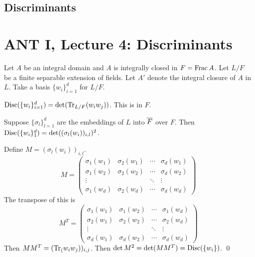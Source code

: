 \newpage
\subsection{Discriminants\label{sec:620_4}}

\newpage
\section{ANT I, Lecture 4: Discriminants}

Let $A$ be an integral domain and $A$ is integrally closed in $F=\operatorname{Frac} A$. Let $L/F$ be a finite separable extension of fields. Let $A'$ denote the integral closure of $A$ in $L$. Take a basis $\{w_i\}_{i=1}^d$ for $L/F$. 

\begin{dfn}[Discriminant]
$\operatorname{Disc}(\{w_i\}_{i=1}^d)=\det(\text{Tr}_{L/F}(w_iw_j))$. This is in $F$.
\end{dfn}

\begin{lem}
Suppose $\{\sigma_l\}_{l=1}^d$ are the embeddings of $L$ into $\overline{F}$ over $F$. Then $\operatorname{Disc}(\{w_i\}_{1}^d)=\det((\sigma_l(w_i))_{i,l})^2$.
\end{lem}

\pf Define $M=(\sigma_l(w_i))_{i,l}$.
	\[
	M=
	\begin{pmatrix}
	\sigma_1(w_1) & \sigma_2(w_1) & \cdots & \sigma_d(w_1) \\
	\sigma_1(w_2) & \sigma_2(w_2) & \cdots & \sigma_d(w_2) \\
	\vdots &  & \ddots & \vdots \\
	\sigma_1(w_d) & \sigma_2(w_d) & \cdots & \sigma_d(w_d)
	\end{pmatrix}
	\]
The transpose of this is
	\[
	M^T=
	\begin{pmatrix}
	\sigma_1(w_1) & \sigma_1(w_2) & \cdots & \sigma_1(w_d) \\
	\sigma_2(w_1) & \sigma_2(w_2) & \cdots & \sigma_2(w_d) \\
	\vdots &  & \ddots & \vdots \\
	\sigma_d(w_1) & \sigma_d(w_2) & \cdots & \sigma_d(w_d)
	\end{pmatrix}
	\]
Then $MM^T=(\text{Tr}_{(}w_iw_j))_{i,j}$. Then $\det M^2=\det(MM^T)=\operatorname{Disc}(\{w_i\})$. \qed \\

